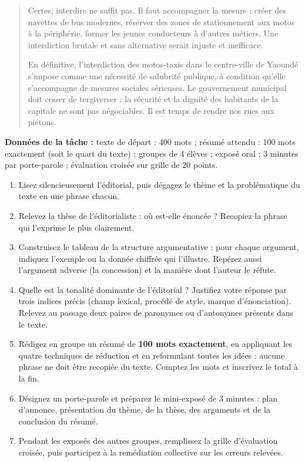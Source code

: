 \documentclass[11pt]{article}
\newcommand{\cle}[1]{{\popxbold\color{popdark}#1}}
\newcounter{popsec}
\newcounter{popsub}
\newcommand{\courssub}[1]{%
  \stepcounter{popsub}%
  \par\vspace{9pt}\noindent{\popxbold\fontsize{11.5}{13}\selectfont\color{popink}{\color{poporange}\thepopsec.\thepopsub}\hspace{6pt}#1}\par\nopagebreak\vspace{4pt}
}
\begin{document}
\begin{quote}
Certes, interdire ne suffit pas. Il faut accompagner la mesure : créer des navettes de bus modernes, réserver des zones de stationnement aux motos à la périphérie, former les jeunes conducteurs à d'autres métiers. Une interdiction brutale et sans alternative serait injuste et inefficace.

En définitive, l'interdiction des motos-taxis dans le centre-ville de Yaoundé s'impose comme une nécessité de salubrité publique, à condition qu'elle s'accompagne de mesures sociales sérieuses. Le gouvernement municipal doit cesser de tergiverser : la sécurité et la dignité des habitants de la capitale ne sont pas négociables. Il est temps de rendre nos rues aux piétons.
\end{quote}

\textbf{Données de la tâche :} texte de départ : 400 mots ; résumé attendu : \cle{100 mots exactement} (soit le quart du texte) ; groupes de 4 élèves ; exposé oral : 3 minutes par porte-parole ; évaluation croisée sur grille de 20 points.

\courssub{Consignes}

\begin{enumerate}
\item Lisez silencieusement l'éditorial, puis dégagez le \cle{thème} et la \cle{problématique} du texte en une phrase chacun.
\item Relevez la \cle{thèse} de l'éditorialiste : où est-elle énoncée ? Recopiez la phrase qui l'exprime le plus clairement.
\item Construisez le tableau de la structure argumentative : pour chaque argument, indiquez l'exemple ou la donnée chiffrée qui l'illustre. Repérez aussi l'argument adverse (la \cle{concession}) et la manière dont l'auteur le réfute.
\item Quelle est la \cle{tonalité} dominante de l'éditorial ? Justifiez votre réponse par trois indices précis (champ lexical, procédé de style, marque d'énonciation). Relevez au passage deux paires de \cle{paronymes} ou d'\cle{antonymes} présents dans le texte.
\item Rédigez en groupe un résumé de \textbf{100 mots exactement}, en appliquant les quatre techniques de réduction et en reformulant toutes les idées : aucune phrase ne doit être recopiée du texte. Comptez les mots et inscrivez le total à la fin.
\item Désignez un porte-parole et préparez le mini-exposé de 3 minutes : plan d'annonce, présentation du thème, de la thèse, des arguments et de la conclusion du résumé.
\item Pendant les exposés des autres groupes, remplissez la grille d'évaluation croisée, puis participez à la remédiation collective sur les erreurs relevées.
\end{enumerate}
\end{document}
